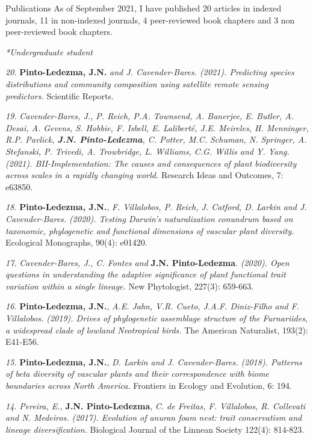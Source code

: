 \documentclass{resume} %
\begin{document}
\begin{rSection}{Publications}
As of September 2021, I have published 20 articles in indexed journals, 11 in non-indexed journals, 4 peer-reviewed book chapters and 3 non peer-reviewed book chapters.

\em{*Undergraduate student}

{\em 20.} {\bf{Pinto-Ledezma, J.N.}} {\em and J. Cavender-Bares. (2021). Predicting species distributions and community composition using satellite remote sensing predictors.} {Scientific Reports.}

{\em 19.} {\em Cavender-Bares, J., P. Reich, P.A. Townsend, A. Banerjee, E. Butler, A. Desai, A. Gevens, S. Hobbie, F. Isbell, E. Laliberté, J.E. Meireles, H. Menninger, R.P. Pavlick, {\bf{J.N. Pinto-Ledezma}}, C. Potter, M.C. Schuman, N. Springer, A. Stefanski, P. Trivedi, A. Trowbridge, L. Williams, C.G. Willis and Y. Yang. (2021). BII-Implementation: The causes and consequences of plant biodiversity across scales in a rapidly changing world.} {Research Ideas and Outcomes, 7: e63850}. 

{\em 18.} {\bf{Pinto-Ledezma, J.N.}}, {\em F. Villalobos, P. Reich, J. Catford, D. Larkin and J. Cavender-Bares. (2020). Testing Darwin's naturalization conundrum based on taxonomic, phylogenetic and functional dimensions of vascular plant diversity.} {Ecological Monographs, 90(4): e01420}. 

{\em 17.} {\em Cavender-Bares, J., C. Fontes and} {\bf{J.N. Pinto-Ledezma}}. {\em (2020). Open questions in understanding the adaptive significance of plant functional trait variation within a single lineage.} {New Phytologist, 227(3): 659-663}. 

{\em 16.} {\bf{Pinto-Ledezma, J.N.}}, {\em A.E. Jahn, V.R. Cueto, J.A.F. Diniz-Filho and F. Villalobos. (2019). Drives of phylogenetic assemblage structure of the Furnariides, a widespread clade of lowland Neotropical birds.} {The American Naturalist, 193(2): E41-E56}. 

{\em 15.} {\bf{Pinto-Ledezma, J.N.}}, {\em D. Larkin and J. Cavender-Bares. (2018). Patterns of beta diversity of vascular plants and their correspondence with biome boundaries across North America.} {Frontiers in Ecology and Evolution, 6: 194}.

{\em 14.} {\em Pereira, E.,} {\bf{J.N. Pinto-Ledezma}}, {\em C. de Freitas, F. Villalobos, R. Collevati and N. Medeiros. (2017). Evolution of anuran foam nest: trait conservatism and lineage diversification.} {Biological Journal of the Linnean Society 122(4): 814-823}. 


\end{rSection}
\end{document}
